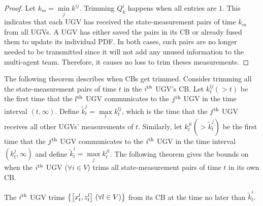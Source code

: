 	\begin{proof}
		
		Let $k_m=\min\limits_j k^{ij}$. 
		Trimming $Q^i_k$ happens when all entries are $1$. 
		This indicates that each UGV has received the state-measurement pairs of time $k_m$ from all UGVs.
		A UGV has either saved the pairs in its CB or already fused them to update its individual PDF.
		In both cases, such pairs are no longer needed to be transmitted since it will not add any unused information to the multi-agent team. 
		Therefore, it causes no loss to trim theses measurements.
	\end{proof}
	
	The following theorem describes when CBs get trimmed.
	Consider trimming all the state-measurement pairs of time $t$ in the $i^\text{th}$ UGV's CB.
	Let $k^{lj}_t (>t)$ be the first time that the $l^\text{th}$ UGV communicates to the $j^\text{th}$ UGV in the time interval $(t,\infty)$.
	Define $\tilde{k}^j_t=\max\limits_l k^{lj}_t$, which is the time that the $j^\text{th}$ UGV receives all other UGVs' measurements of $t$.
	Similarly, let $k^{ji}_t (> \tilde{k}^j_t)$ be the first time that the $j^\text{th}$ UGV communicates to the $i^\text{th}$ UGV in the time interval $(k^j_t,\infty)$ and define $\tilde{k}^i_t=\max\limits_j k^{ji}_t$.
	The following theorem gives the bounds on when the $i^\text{th}$ UGV ($\forall i\in V$) trims all state-measurement pairs of time $t$ in its own CB.
	\begin{thm}\label{thm:upd_tl_freq}		
		The $i^\text{th}$ UGV trims $\left\lbrace\left[x^l_t,z^l_t\right] \,(\forall l\in V)\right\rbrace$ from its CB at the time no later than $\tilde{k}^i_t$.
	\end{thm}
	
